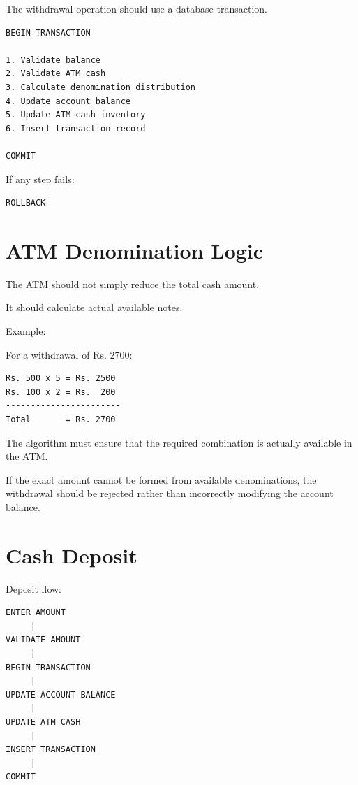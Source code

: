 \documentclass[12pt,a4paper]{article}
\begin{document}
The withdrawal operation should use a database transaction.

\begin{verbatim}
BEGIN TRANSACTION

1. Validate balance
2. Validate ATM cash
3. Calculate denomination distribution
4. Update account balance
5. Update ATM cash inventory
6. Insert transaction record

COMMIT
\end{verbatim}

If any step fails:

\begin{verbatim}
ROLLBACK
\end{verbatim}


\section{ATM Denomination Logic}

The ATM should not simply reduce the total cash amount.

It should calculate actual available notes.

Example:

For a withdrawal of Rs. 2700:

\begin{verbatim}
Rs. 500 x 5 = Rs. 2500
Rs. 100 x 2 = Rs.  200
-----------------------
Total       = Rs. 2700
\end{verbatim}

The algorithm must ensure that the required combination is actually
available in the ATM.

If the exact amount cannot be formed from available denominations,
the withdrawal should be rejected rather than incorrectly modifying
the account balance.


\section{Cash Deposit}

Deposit flow:

\begin{verbatim}
ENTER AMOUNT
     |
VALIDATE AMOUNT
     |
BEGIN TRANSACTION
     |
UPDATE ACCOUNT BALANCE
     |
UPDATE ATM CASH
     |
INSERT TRANSACTION
     |
COMMIT
\end{verbatim}
\end{document}

